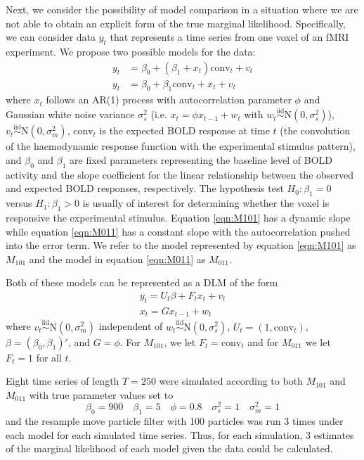 \documentclass{article}
\begin{document}
Next, we consider the possibility of model comparison in a situation where we are not able to obtain an explicit form of the true marginal likelihood. Specifically, we can consider data $y_t$ that represents a time series from one voxel of an fMRI experiment. We propose two possible models for the data:
\begin{align}
y_t &= \beta_0 + (\beta_1 + x_t)\mbox{conv}_t + v_t \label{eqn:M101} \\
y_t &= \beta_0 + \beta_1\mbox{conv}_t + x_t + v_t \label{eqn:M011}
\end{align}
\noindent where $x_t$ follows an AR(1) process with autocorrelation parameter $\phi$ and Gaussian white noise variance $\sigma^2_s$ (i.e. $x_t = \phi x_{t-1} + w_t$ with $w_t \stackrel{\mbox{iid}}{\sim} \mbox{N}(0,\sigma^2_s)$), $v_t \stackrel{\mbox{iid}}{\sim} \mbox{N}(0,\sigma^2_m)$, $\mbox{conv}_t$ is the expected BOLD response at time $t$ (the convolution of the haemodynamic response function with the experimental stimulus pattern), and $\beta_0$ and $\beta_1$ are fixed parameters representing the baseline level of BOLD activity and the slope coefficient for the linear relationship between the observed and expected BOLD responses, respectively. The hypothesis test $H_0: \beta_1 = 0$ versus $H_1: \beta_1 > 0$ is usually of interest for determining whether the voxel is responsive the experimental stimulus. Equation \eqref{eqn:M101} has a dynamic slope while equation \eqref{eqn:M011} has a constant slope with the autocorrelation pushed into the error term. We refer to the model represented by equation \eqref{eqn:M101} as $M_{101}$ and the model in equation \eqref{eqn:M011} as $M_{011}$.

Both of these models can be represented as a DLM of the form
\begin{align}
y_t = U_t\beta + F_tx_t + v_t \label{eqn:obs} \\
x_t = Gx_{t-1} + w_t \label{eqn:state}
\end{align}
\noindent where $v_t \stackrel{\mbox{iid}}{\sim} \mbox{N}(0,\sigma^2_m)$ independent of $w_t \stackrel{\mbox{iid}}{\sim} \mbox{N}(0,\sigma^2_s)$, $U_t = (1, \mbox{conv}_t)$, $\beta = (\beta_0,\beta_1)'$, and $G = \phi$. For $M_{101}$, we let $F_t = \mbox{conv}_t$ and for $M_{011}$ we let $F_t = 1$ for all $t$.

Eight time series of length $T = 250$ were simulated according to both $M_{101}$ and $M_{011}$ with true parameter values set to \[\beta_0 = 900 \quad \beta_1 = 5 \quad \phi = 0.8 \quad \sigma^2_s = 1 \quad \sigma^2_m = 1\] and the resample move particle filter with 100 particles was run 3 times under each model for each simulated time series. Thus, for each simulation, 3 estimates of the marginal likelihood of each model given the data could be calculated.
\end{document}
